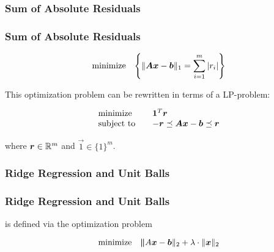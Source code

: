 \subsubsection{Sum of Absolute Residuals}

\begin{frame}
  \frametitle{Sum of Absolute Residuals}


  \begin{displaymath}
    \mbox{minimize}\quad \Bigg\{ \| {\bm A} {\bm x} -{\bm b}\|_1 = \sum_{i=1}^m  |r_i| \Bigg\}
  \end{displaymath}
  \pause
  
  This optimization problem can be rewritten in terms of a LP-problem:
   
  \begin{eqnarray*}
    \begin{array}{lcl}
      \mbox{minimize}   & & {\bm 1}^T {\bm r} \\
      \mbox{subject to} & & - {\bm r} \preceq  {\bm A} {\bm x} -{\bm b}\preceq {\bm r}
    \end{array}
  \end{eqnarray*}
  
  where ${\bm r}\in \mathbb{R}^m$ and $\vec 1 \in \{1\}^m$.
\end{frame}


\subsubsection{Ridge Regression and Unit Balls}

\begin{frame}
  \frametitle{Ridge Regression and Unit Balls}

   is defined via the optimization problem

  \begin{displaymath}
    \mbox{minimize} \quad {\bm \|}A{\bm x} -{\bm b}\|_2+\lambda \cdot\|{\bm x}\|_2
  \end{displaymath}
  
  \begin{center}
  \end{center}
\end{frame}


